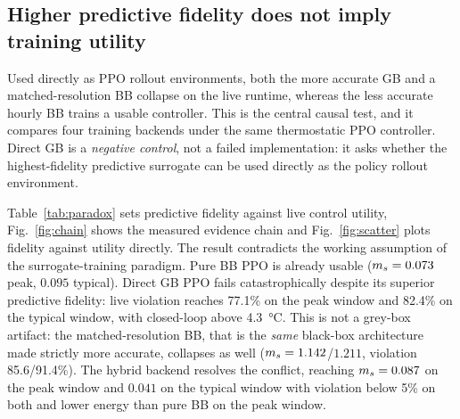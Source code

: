 \subsection{Higher predictive fidelity does not imply training utility}\label{sec:paradox}

Used directly as PPO rollout environments, both the more accurate GB and a matched-resolution BB
collapse on the live runtime, whereas the less accurate hourly BB trains a usable controller. This
is the central causal test, and it compares four training backends under the same thermostatic PPO
controller. Direct GB is a \emph{negative control}, not a failed implementation: it asks whether the
highest-fidelity predictive surrogate can be used directly as the policy rollout environment.

Table~\ref{tab:paradox} sets predictive fidelity against live control utility, Fig.~\ref{fig:chain}
shows the measured evidence chain and Fig.~\ref{fig:scatter} plots fidelity against utility
directly. The result contradicts the working assumption of the surrogate-training paradigm. Pure BB
PPO is already usable ($m_s=0.073$ peak, $0.095$ typical). Direct GB PPO fails catastrophically
despite its superior predictive fidelity: live violation reaches 77.1\% on the peak window and
82.4\% on the typical window, with closed-loop \RMSE{} above \SI{4.3}{\celsius}. This is not a
grey-box artifact: the matched-resolution BB, that is the \emph{same} black-box architecture made
strictly more accurate, collapses as well ($m_s=1.142$/$1.211$, violation 85.6/91.4\%). The hybrid
backend resolves the conflict, reaching $m_s=0.087$ on the peak window and $0.041$ on the typical
window with violation below 5\% on both and lower energy than pure BB on the peak window.

